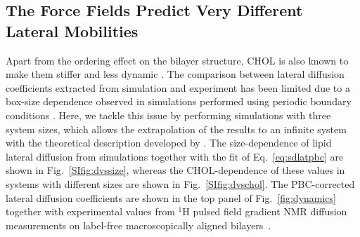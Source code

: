 \documentclass[journal=jctcce]{achemso}
\begin{document}
\subsection{The Force Fields Predict Very Different Lateral Mobilities}

Apart from the ordering effect on the bilayer structure, CHOL is also known to make them stiffer and less dynamic \cite{rog2009ordering,filippov2003effect,filippov2003influence}. The comparison between lateral diffusion coefficients extracted from simulation and experiment has been limited due to a box-size dependence observed in simulations performed using periodic boundary conditions \cite{vogele2016divergent,vogele2018hydrodynamics,camley2015strong}. Here, we tackle this issue by performing simulations with three system sizes, which allows the extrapolation of the results to an infinite system with the theoretical description developed by \citeauthor{vogele2016divergent} \cite{vogele2016divergent,vogele2018hydrodynamics}. The size-dependence of lipid lateral diffusion from simulations together with the fit of Eq.~\eqref{eq:sdlatpbc} are shown in Fig.~\ref{SIfig:dvssize}, whereas the CHOL-dependence of these values in systems with different sizes are shown in Fig.~\ref{SIfig:dvschol}. The PBC-corrected lateral diffusion coefficients are shown in the top panel of Fig.~\ref{fig:dynamics} together with experimental values from $^1$H pulsed field gradient NMR diffusion measurements on label-free macroscopically aligned bilayers~\cite{filippov2003influence,filippov2003effect}. 
\end{document}
